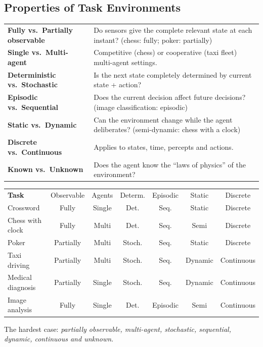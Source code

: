 \subsection{Properties of Task Environments}
\begin{tabularx}{\linewidth}{>{\leavevmode\bfseries\color{navy}}p{3.6cm}X}
\toprule
Fully vs.\ Partially observable & Do sensors give the complete relevant state at each instant? (chess: fully; poker: partially)\\
Single vs.\ Multi-agent & Competitive (chess) or cooperative (taxi fleet) multi-agent settings.\\
Deterministic vs.\ Stochastic & Is the next state completely determined by current state + action?\\
Episodic vs.\ Sequential & Does the current decision affect future decisions? (image classification: episodic)\\
Static vs.\ Dynamic & Can the environment change while the agent deliberates? (semi-dynamic: chess with a clock)\\
Discrete vs.\ Continuous & Applies to states, time, percepts and actions.\\
Known vs.\ Unknown & Does the agent know the ``laws of physics'' of the environment?\\\bottomrule
\end{tabularx}

\begin{center}\small
\begin{tabular}{lcccccc}
\rowcolor{navy}\color{white}\textbf{Task}&\color{gold}Observable&\color{gold}Agents&\color{gold}Determ.&\color{gold}Episodic&\color{gold}Static&\color{gold}Discrete\\
Crossword&Fully&Single&Det.&Seq.&Static&Discrete\\
\rowcolor{ivory}Chess with clock&Fully&Multi&Det.&Seq.&Semi&Discrete\\
Poker&Partially&Multi&Stoch.&Seq.&Static&Discrete\\
\rowcolor{ivory}Taxi driving&Partially&Multi&Stoch.&Seq.&Dynamic&Continuous\\
Medical diagnosis&Partially&Single&Stoch.&Seq.&Dynamic&Continuous\\
\rowcolor{ivory}Image analysis&Fully&Single&Det.&Episodic&Semi&Continuous\\
\end{tabular}\end{center}
The hardest case: \emph{partially observable, multi-agent, stochastic, sequential, dynamic, continuous and unknown}.

